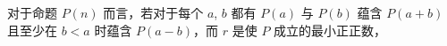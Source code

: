 
\begin{lemma}{}
对于命题 $P(n)$ 而言，若对于每个 $a$, $b$ 都有 $P(a)$ 与 $P(b)$ 蕴含 $P(a+b)$ 且至少在 $b <  a$ 时蕴含 $P(a-b)$，而 $r$ 是使 $P$ 成立的最小正正数，
\end{lemma}